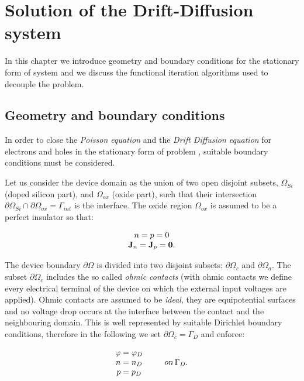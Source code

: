 \chapter{Solution of the Drift-Diffusion system}

In this chapter we introduce geometry and boundary conditions for the stationary form of system  and we discuss the functional iteration algorithms used to decouple the problem.

\section{Geometry and boundary conditions}

In order to close the \textit{Poisson equation} and the \textit{Drift Diffusion equation} for electrons and holes in the stationary form of problem , suitable boundary conditions must be considered.

Let us consider the device domain as the union of two open disjoint subsets, $\Omega_{Si}$ (doped silicon part), and $\Omega_{ox}$ (oxide part), such that their intersection $\partial \Omega_{Si} \cap \partial \Omega_{ox} = \Gamma_{int}$ is the interface. The oxide region $\Omega_{ox}$ is assumed to be a perfect insulator so that:

\begin{equation}
\label{eq: hypotesis oxide}
\begin{array}{c}
n = p = 0 \\
\mathbf{J}_n = \mathbf{J}_p = \mathbf{0}.
\end{array}
\end{equation}

The device boundary $\partial \Omega$ is divided into two disjoint subsets: $\partial \Omega_{c}$ and $\partial \Omega_{a}$.
The subset $\partial \Omega_{c}$ includes the so called \textit{ohmic contacts} (with ohmic contacts we define every electrical terminal of the device on which the external input voltages are applied). Ohmic contacts are assumed to be \textit{ideal}, they are equipotential surfaces and no voltage drop occurs at the interface between the contact and the neighbouring domain. This is well represented by suitable Dirichlet boundary conditions, therefore in the following we set $\partial \Omega_{c} = \Gamma_D$ and enforce:

\begin{equation}
\label{eq: dirichlet boundary condition}
\begin{array}{cc}
\varphi = \varphi_D & \\
n = n_D & \psp{10} on \, \Gamma_D .\\
p = p_D & 
\end{array}
\end{equation}

